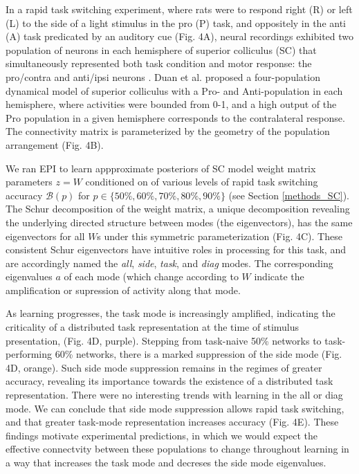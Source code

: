 \documentclass[11pt]{article}
\begin{document}
In a rapid task switching experiment, where rats were to respond right (R) or left (L) to the side of a light stimulus in the pro (P) task, and oppositely in the anti (A) task predicated by an auditory cue (Fig. 4A), neural recordings exhibited two population of neurons in each hemisphere of superior colliculus (SC) that simultaneously represented both task condition and motor response: the pro/contra and anti/ipsi neurons \cite{duan2018collicular}.  Duan et al. proposed a four-population dynamical model of superior colliculus with a Pro- and Anti-population in each hemisphere, where activities were bounded from 0-1, and a high output of the Pro population in a given hemisphere corresponds to the  contralateral response. The connectivity matrix is parameterized by the geometry of the population arrangement (Fig. 4B).

We ran EPI to learn appproximate posteriors of SC model weight matrix parameters $z = W$ conditioned on of various levels of rapid task switching accuracy $\mathcal{B}(p)$ for $p \in \{50\%, 60\%, 70\%, 80\%, 90\%\}$ (see Section \ref{methods_SC}).  The Schur decomposition of the weight matrix, a unique decomposition revealing the underlying directed structure between modes (the eigenvectors), has the same eigenvectors for all $W$s under this symmetric parameterization (Fig. 4C).
These consistent Schur eigenvectors have intuitive roles in processing for this task, and are accordingly named the \textit{all}, \textit{side}, \textit{task}, and \textit{diag} modes. The corresponding eigenvalues $a$ of each mode (which change according to $W$ indicate the amplification or supression of activity along that mode.   

As learning progresses, the task mode is increasingly amplified, indicating the criticality of a distributed task representation at the time of stimulus presentation, (Fig. 4D, purple).  Stepping from task-naive 50\% networks to task-performing 60\% networks, there is a marked suppression of the side mode (Fig. 4D, orange).  Such side mode suppression remains in the regimes of greater accuracy, revealing its importance towards the existence of a distributed task representation.   There were no interesting trends with learning in the all or diag mode. We can conclude that side mode suppression allows rapid task switching, and that greater task-mode representation increases accuracy (Fig. 4E).  These findings motivate experimental predictions, in which we would expect the effective connectvity between these populations to change throughout learning in a way that increases the task mode and decreses the side mode eigenvalues.
\end{document}
